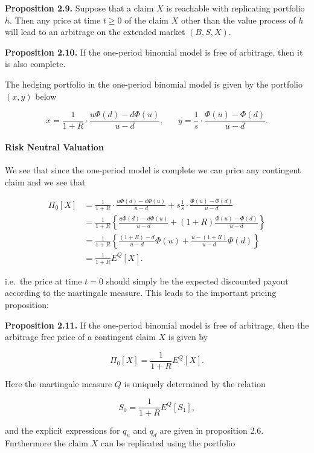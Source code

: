 \documentclass[
]{article}
\begin{document}
\textbf{Proposition 2.9.} Suppose that a claim \(X\) is reachable with
replicating portfolio \(h\). Then any price at time \(t\ge 0\) of the
claim \(X\) other than the value process of \(h\) will lead to an
arbitrage on the extended market \((B,S,X)\).

\textbf{Proposition 2.10.} If the one-period binomial model is free of
arbitrage, then it is also complete.

The hedging portfolio in the one-period binomial model is given by the
portfolio \((x,y)\) below

\[
x=\frac{1}{1+R}\cdot\frac{u\Phi(d)-d\Phi(u)}{u-d},\hspace{20pt}y=\frac{1}{s}\cdot\frac{\Phi(u)-\Phi(d)}{u-d}.
\]

\hypertarget{risk-neutral-valuation}{%
\paragraph{Risk Neutral Valuation}\label{risk-neutral-valuation}}

We see that since the one-period model is complete we can price any
contingent claim and we see that

\begin{align*}
\Pi_0[X]&=\frac{1}{1+R}\cdot\frac{u\Phi(d)-d\Phi(u)}{u-d}+s\frac{1}{s}\cdot\frac{\Phi(u)-\Phi(d)}{u-d}\\
&=\frac{1}{1+R}\left\{\frac{u\Phi(d)-d\Phi(u)}{u-d}+(1+R)\frac{\Phi(u)-\Phi(d)}{u-d}\right\}\\
&=\frac{1}{1+R}\left\{\frac{(1+R)-d}{u-d}\Phi(u)+\frac{u-(1+R)}{u-d}\Phi(d)\right\}\\
&=\frac{1}{1+R}E^Q[X].
\end{align*}

i.e.~the price at time \(t=0\) should simply be the expected discounted
payout according to the martingale measure. This leads to the important
pricing proposition:

\textbf{Proposition 2.11.} If the one-period binomial model is free of
arbitrage, then the arbitrage free price of a contingent claim \(X\) is
given by

\[
\Pi_0[X]=\frac{1}{1+R}E^Q[X].\tag{2.4}
\]

Here the martingale measure \(Q\) is uniquely determined by the relation

\[
S_0=\frac{1}{1+R}E^Q[S_1],\tag{2.5}
\]

and the explicit expressions for \(q_u\) and \(q_d\) are given in
proposition 2.6. Furthermore the claim \(X\) can be replicated using the
portfolio
\end{document}
